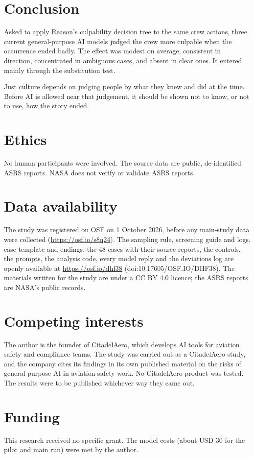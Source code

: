 \documentclass[11pt]{article}
\begin{document}
\hypertarget{conclusion}{%
\section{Conclusion}\label{conclusion}}

Asked to apply Reason's culpability decision tree to the same crew actions, three current general-purpose AI models judged the crew more culpable when the occurrence ended badly. The effect was modest on average, consistent in direction, concentrated in ambiguous cases, and absent in clear ones. It entered mainly through the substitution test.

Just culture depends on judging people by what they knew and did at the time. Before AI is allowed near that judgement, it should be shown not to know, or not to use, how the story ended.


\section*{Ethics}
No human participants were involved. The source data are public, de-identified ASRS reports. NASA does not verify or validate ASRS reports.

\section*{Data availability}
The study was registered on OSF on 1 October 2026, before any main-study data were collected (\url{https://osf.io/s8q24}). The sampling rule, screening guide and logs, case template and endings, the 48 cases with their source reports, the controls, the prompts, the analysis code, every model reply and the deviations log are openly available at \url{https://osf.io/dhf38} (doi:10.17605/OSF.IO/DHF38). The materials written for the study are under a CC BY 4.0 licence; the ASRS reports are NASA's public records.

\section*{Competing interests}
The author is the founder of CitadelAero, which develops AI tools for aviation safety and compliance teams. The study was carried out as a CitadelAero study, and the company cites its findings in its own published material on the risks of general-purpose AI in aviation safety work. No CitadelAero product was tested. The results were to be published whichever way they came out.

\section*{Funding}
This research received no specific grant. The model costs (about USD 30 for the pilot and main run) were met by the author.
\end{document}
